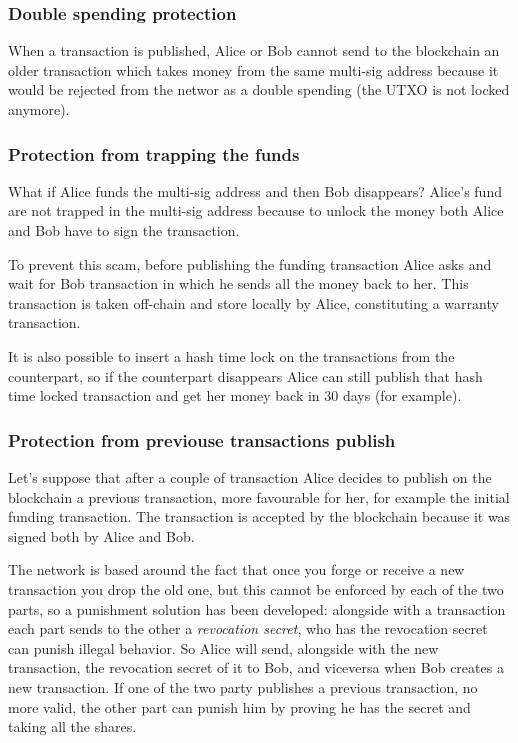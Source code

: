 \subsubsection{Double spending protection}
When a transaction is published, Alice or Bob cannot send to the blockchain an older transaction which takes money from the same multi-sig address because it would be rejected from the networ as a double spending (the UTXO is not locked anymore).

\subsubsection{Protection from trapping the funds}
What if Alice funds the multi-sig address and then Bob disappears?
Alice's fund are not trapped in the multi-sig address because to unlock the money both Alice and Bob have to sign the transaction.

To prevent this scam, before publishing the funding transaction Alice asks and wait for Bob transaction in which he sends all the money back to her.
This transaction is taken off-chain and store locally by Alice, constituting a warranty transaction.

It is also possible to insert a hash time lock on the transactions from the counterpart, so if the counterpart disappears Alice can still publish that hash time locked transaction and get her money back in 30 days (for example).

\subsubsection{Protection from previouse transactions publish}
Let's suppose that after a couple of transaction Alice decides to publish on the blockchain a previous transaction, more favourable for her, for example the initial funding transaction.
The transaction is accepted by the blockchain because it was signed both by Alice and Bob.

The network is based around the fact that once you forge or receive a new transaction you drop the old one, but this cannot be enforced by each of the two parts, so a punishment solution has been developed: alongside with a transaction each part sends to the other a \emph{revocation secret}, who has the revocation secret can punish illegal behavior.
So Alice will send, alongside with the new transaction, the revocation secret of it to Bob, and viceversa when Bob creates a new transaction.
If one of the two party publishes a previous transaction, no more valid, the other part can punish him by proving he has the secret and taking all the shares.

